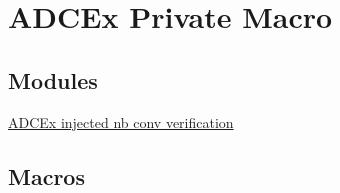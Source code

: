 \hypertarget{group___a_d_c_ex___private___macro}{\section{A\-D\-C\-Ex Private Macro}
\label{group___a_d_c_ex___private___macro}
}
\subsection*{Modules}
\begin{DoxyCompactItemize}
\item 
\hyperlink{group___a_d_c_ex__injected__nb__conv__verification}{A\-D\-C\-Ex injected nb conv verification}
\end{DoxyCompactItemize}
\subsection*{Macros}
